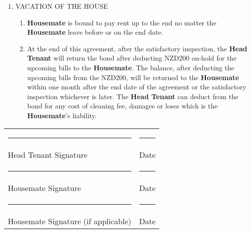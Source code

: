 \documentclass[12pt,a4paper]{article}
\begin{document}
\begin{enumerate}
\item VACATION OF THE HOUSE
    \begin{enumerate}[label=\alph*.]
    \item \textbf{Housemate} is bound to pay rent up to the end no matter the \textbf{Housemate} leave before or on the end date.
    
    \item At the end of this agreement, after the satisfactory inspection, the \textbf{Head Tenant} will return the bond after deducting NZD200 on-hold for the upcoming bills to the \textbf{Housemate}. The balance, after deducting the upcoming bills from the NZD200, will be returned to the \textbf{Housemate} within one month after the end date of the agreement or the satisfactory inspection whichever is later. The \textbf{Head Tenant} can deduct from the bond for any cost of cleaning fee, damages or loses which is the \textbf{Housemate}'s liability.
    \end{enumerate}
\end{enumerate}

\vspace{2cm}
\noindent\begin{tabular}{p{}p{}}
\rule{8cm}{0.4pt} & \rule{8cm}{0.4pt} \\
Head Tenant Signature & Date \\[1cm]
\rule{8cm}{0.4pt} & \rule{8cm}{0.4pt} \\
Housemate Signature & Date \\[1cm]
\rule{8cm}{0.4pt} & \rule{8cm}{0.4pt} \\
Housemate Signature (if applicable) & Date \\
\end{tabular}
\end{document}
